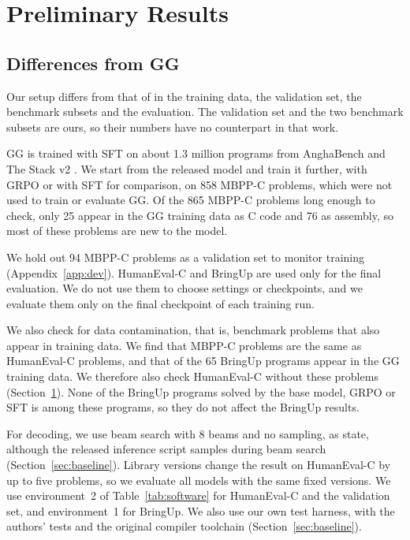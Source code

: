 \documentclass{article}
\begin{document}
\section{\texorpdfstring{Preliminary Results}{Preliminary Results}}
\label{sec:results}

\subsection{\texorpdfstring{Differences from GG}{Differences from GG}}
\label{sec:differences}
Our setup differs from that of \citet{gg} in the training data, the validation set, the benchmark subsets and the evaluation. The validation set and the two benchmark subsets are ours, so their numbers have no counterpart in that work.

GG is trained with SFT on about 1.3 million programs from AnghaBench \citep{anghabench} and The Stack v2 \citep{stackv2}. We start from the released model and train it further, with GRPO or with SFT for comparison, on 858 MBPP-C problems, which were not used to train or evaluate GG. Of the 865 MBPP-C problems long enough to check, only 25 appear in the GG training data as C code and 76 as assembly, so most of these problems are new to the model.

We hold out 94 MBPP-C problems as a validation set to monitor training (Appendix~\ref{app:dev}). HumanEval-C and BringUp are used only for the final evaluation. We do not use them to choose settings or checkpoints, and we evaluate them only on the final checkpoint of each training run.

We also check for data contamination, that is, benchmark problems that also appear in training data. We find that  MBPP-C problems are the same as  HumanEval-C problems, and that  of the 65 BringUp programs appear in the GG training data. We therefore also check HumanEval-C without these  problems (Section~\ref{sec:results}). None of the BringUp programs solved by the base model, GRPO or SFT is among these  programs, so they do not affect the BringUp results.

For decoding, we use beam search with 8 beams and no sampling, as \citet{gg} state, although the released inference script samples during beam search (Section~\ref{sec:baseline}). Library versions change the result on HumanEval-C by up to five problems, so we evaluate all models with the same fixed versions. We use environment~2 of Table~\ref{tab:software} for HumanEval-C and the validation set, and environment~1 for BringUp. We also use our own test harness, with the authors' tests and the original compiler toolchain (Section~\ref{sec:baseline}).
\end{document}
